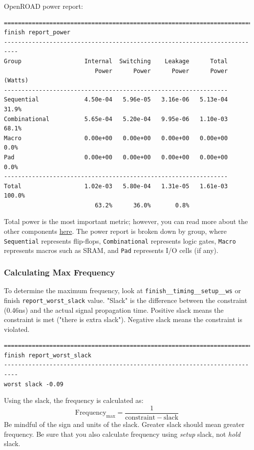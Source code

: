 \documentclass[a4paper,12pt,twoside]{article}
\begin{document}
OpenROAD power report:
\begin{verbatim}
==========================================================================
finish report_power
--------------------------------------------------------------------------
Group                  Internal  Switching    Leakage      Total
                          Power      Power      Power      Power (Watts)
----------------------------------------------------------------
Sequential             4.50e-04   5.96e-05   3.16e-06   5.13e-04  31.9%
Combinational          5.65e-04   5.20e-04   9.95e-06   1.10e-03  68.1%
Macro                  0.00e+00   0.00e+00   0.00e+00   0.00e+00   0.0%
Pad                    0.00e+00   0.00e+00   0.00e+00   0.00e+00   0.0%
----------------------------------------------------------------
Total                  1.02e-03   5.80e-04   1.31e-05   1.61e-03 100.0%
                          63.2%      36.0%       0.8%
\end{verbatim}
Total power is the most important metric; however, you can read more about the other components \href{https://blogs.cuit.columbia.edu/zp2130/modeling_power_terminology}{here}. The power report is broken down by group, where \texttt{Sequential} represents flip-flops, \texttt{Combinational} represents logic gates, \texttt{Macro} represents macros such as SRAM, and \texttt{Pad} represents I/O cells (if any).
\subsubsection{Calculating Max Frequency}
To determine the maximum frequency, look at \texttt{finish\_\_timing\_\_setup\_\_ws} or finish \texttt{report\_worst\_slack} value. "Slack" is the difference between the constraint (0.46ns) and the actual signal propagation time. Positive slack means the constraint is met ("there is extra slack"). Negative slack means the constraint is violated.
\begin{verbatim}
==========================================================================
finish report_worst_slack
--------------------------------------------------------------------------
worst slack -0.09
\end{verbatim}
Using the slack, the frequency is calculated as:
\begin{equation}
    \mathrm{Frequency_{max}=\frac{1}{constraint-slack}}
\end{equation}
Be mindful of the sign and units of the slack. Greater slack should mean greater frequency. Be sure that you also calculate frequency using \textit{setup} slack, not \textit{hold} slack.
\end{document}
